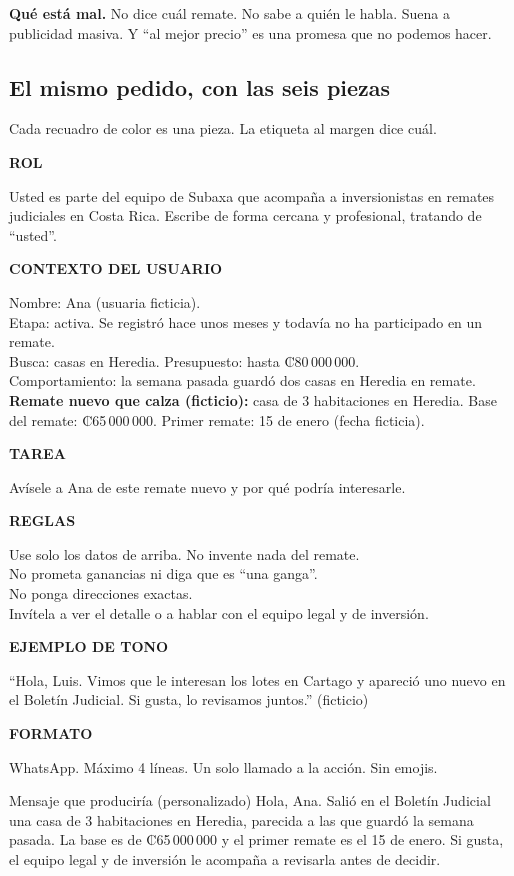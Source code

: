 \documentclass[11pt,letterpaper]{article}
\newcommand{\colones}{{\fuentecolon ₡}}
\newcommand{\pieza}[3]{%
  \begin{tcolorbox}[colback=#1!6,colframe=#1,boxrule=0pt,
    leftrule=3pt,arc=0pt,left=6pt,right=6pt,top=3pt,bottom=3pt,
    before skip=3pt,after skip=3pt]
  \begin{minipage}[t]{2.3cm}\raggedright\footnotesize\bfseries
    \textcolor{#1}{\MakeUppercase{#2}}\end{minipage}\hfill
  \begin{minipage}[t]{\dimexpr\linewidth-2.3cm-8pt\relax}
    \small\raggedright #3\end{minipage}
  \end{tcolorbox}}
\begin{document}
\textbf{Qué está mal.} No dice cuál remate. No sabe a quién le habla. Suena
a publicidad masiva. Y \enquote{al mejor precio} es una promesa que no
podemos hacer.

\subsection*{El mismo pedido, con las seis piezas}

Cada recuadro de color es una pieza. La etiqueta al margen dice cuál.

\pieza{pRol}{Rol}{Usted es parte del equipo de Subaxa que acompaña a
inversionistas en remates judiciales en Costa Rica. Escribe de forma
cercana y profesional, tratando de \enquote{usted}.}

\pieza{pContexto}{Contexto del usuario}{%
Nombre: Ana (usuaria ficticia).\\
Etapa: activa. Se registró hace unos meses y todavía no ha participado en
un remate.\\
Busca: casas en Heredia. Presupuesto: hasta \colones 80\,000\,000.\\
Comportamiento: la semana pasada guardó dos casas en Heredia en remate.\\[0.3em]
\textbf{Remate nuevo que calza (ficticio):} casa de 3 habitaciones en
Heredia. Base del remate: \colones 65\,000\,000. Primer remate: 15 de enero
(fecha ficticia).}

\pieza{pTarea}{Tarea}{Avísele a Ana de este remate nuevo y por qué podría
interesarle.}

\pieza{pReglas}{Reglas}{%
Use solo los datos de arriba. No invente nada del remate.\\
No prometa ganancias ni diga que es \enquote{una ganga}.\\
No ponga direcciones exactas.\\
Invítela a ver el detalle o a hablar con el equipo legal y de inversión.}

\pieza{pEjemplo}{Ejemplo de tono}{\enquote{Hola, Luis. Vimos que le interesan
los lotes en Cartago y apareció uno nuevo en el Boletín Judicial. Si gusta,
lo revisamos juntos.} (ficticio)}

\pieza{pFormato}{Formato}{WhatsApp. Máximo 4 líneas. Un solo llamado a la
acción. Sin emojis.}

\begin{mensaje}{Mensaje que produciría (personalizado)}
\small Hola, Ana. Salió en el Boletín Judicial una casa de 3 habitaciones en
Heredia, parecida a las que guardó la semana pasada. La base es de
\colones 65\,000\,000 y el primer remate es el 15 de enero. Si gusta, el
equipo legal y de inversión le acompaña a revisarla antes de decidir.
\end{mensaje}
\end{document}
